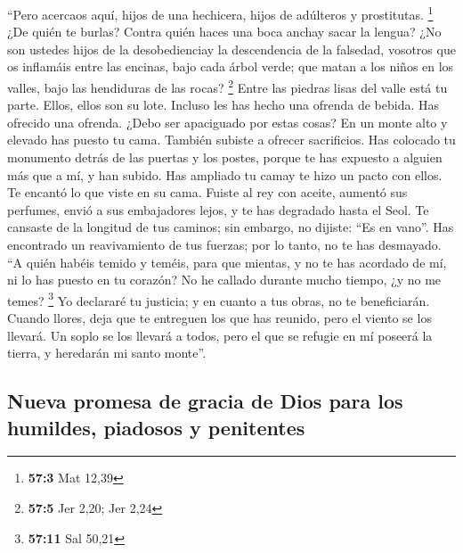 \begin{paracol}{2}
 ``Pero acercaos aquí, hijos de una hechicera, hijos de
adúlteros y prostitutas. \footnote{\textbf{57:3} Mat 12,39}
 ¿De quién te burlas? Contra quién haces una boca anchay
sacar la lengua? ¿No son ustedes hijos de la desobedienciay la
descendencia de la falsedad,  vosotros que os inflamáis
entre las encinas, bajo cada árbol verde; que matan a los niños en los
valles, bajo las hendiduras de las rocas? \footnote{\textbf{57:5} Jer
  2,20; Jer 2,24}  Entre las piedras lisas del valle está
tu parte. Ellos, ellos son su lote. Incluso les has hecho una ofrenda de
bebida. Has ofrecido una ofrenda. ¿Debo ser apaciguado por estas cosas?
 En un monte alto y elevado has puesto tu cama. También
subiste a ofrecer sacrificios.  Has colocado tu monumento
detrás de las puertas y los postes, porque te has expuesto a alguien más
que a mí, y han subido. Has ampliado tu camay te hizo un pacto con
ellos. Te encantó lo que viste en su cama.  Fuiste al rey
con aceite, aumentó sus perfumes, envió a sus embajadores lejos, y te
has degradado hasta el Seol.  Te cansaste de la longitud
de tus caminos; sin embargo, no dijiste: ``Es en vano''. Has encontrado
un reavivamiento de tus fuerzas; por lo tanto, no te has desmayado.
 ``A quién habéis temido y teméis, para que mientas, y no
te has acordado de mí, ni lo has puesto en tu corazón? No he callado
durante mucho tiempo, ¿y no me temes? \footnote{\textbf{57:11} Sal 50,21}
 Yo declararé tu justicia; y en cuanto a tus obras, no te
beneficiarán.  Cuando llores, deja que te entreguen los
que has reunido, pero el viento se los llevará. Un soplo se los llevará
a todos, pero el que se refugie en mí poseerá la tierra, y heredarán mi
santo monte''.

\hypertarget{nueva-promesa-de-gracia-de-dios-para-los-humildes-piadosos-y-penitentes}{%
\subsection{Nueva promesa de gracia de Dios para los humildes, piadosos
y
penitentes}\label{nueva-promesa-de-gracia-de-dios-para-los-humildes-piadosos-y-penitentes}}


\end{paracol}
